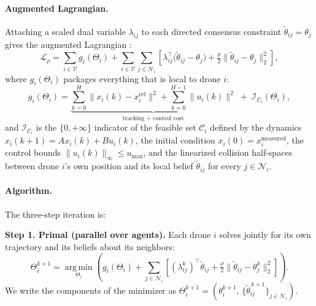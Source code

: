 \documentclass[11pt,onecolumn]{article}
\begin{document}
\paragraph{Augmented Lagrangian.}
Attaching a scaled dual variable $\lambda_{ij}$ to each directed consensus
constraint $\tilde\theta_{ij} = \theta_j$ gives the augmented Lagrangian
\cite{boyd2011admm,chen2024tutorial}:
\begin{equation}
  \mathcal{L}_\rho = \sum_{i \in \mathcal{V}} g_i(\Theta_i)
  + \sum_{i \in \mathcal{V}} \sum_{j \in \mathcal{N}_i} \!\left[
      \lambda_{ij}^\top \bigl(\tilde\theta_{ij} - \theta_j\bigr)
      + \tfrac{\rho}{2}\bigl\|\tilde\theta_{ij} - \theta_j\bigr\|_2^2
    \right],
  \label{eq:aug_lag}
\end{equation}
where $g_i(\Theta_i)$ packages everything that is local to drone $i$:
\begin{equation}
  g_i(\Theta_i) = \underbrace{\sum_{k=0}^{H} \|x_i(k) - x_i^{\mathrm{ref}}\|^2
                  + \sum_{k=0}^{H-1} \|u_i(k)\|^2}_{\text{tracking + control cost}}
                  \;+\; \mathcal{I}_{\mathcal{C}_i}(\Theta_i),
  \label{eq:gi}
\end{equation}
and $\mathcal{I}_{\mathcal{C}_i}$ is the $\{0, +\infty\}$ indicator of the feasible set
$\mathcal{C}_i$ defined by the dynamics $x_i(k+1) = A x_i(k) + B u_i(k)$, the initial
condition $x_i(0) = x_i^{\mathrm{measured}}$, the control bounds
$\|u_i(k)\|_\infty \le u_{\max}$, and the linearized collision half-spaces between drone
$i$'s own position and its local belief $\tilde\theta_{ij}$ for every
$j \in \mathcal{N}_i$.

\paragraph{Algorithm.}
The three-step iteration is:

\textbf{Step 1. Primal (parallel over agents).}  Each drone $i$ solves jointly for
its own trajectory and its beliefs about its neighbors:
\begin{equation}
  \Theta_i^{k+1} = \operatorname*{arg\,min}_{\Theta_i} \left(
    g_i(\Theta_i)
    + \sum_{j \in \mathcal{N}_i} \!\left[
        (\lambda_{ij}^k)^\top \tilde\theta_{ij}
        + \tfrac{\rho}{2}\bigl\|\tilde\theta_{ij} - \theta_j^k\bigr\|_2^2
      \right] \right).
  \label{eq:admm_primal}
\end{equation}
We write the components of the minimizer as
$\Theta_i^{k+1} = (\theta_i^{k+1},\, \{\tilde\theta_{ij}^{\,k+1}\}_{j \in \mathcal{N}_i})$.
\end{document}
